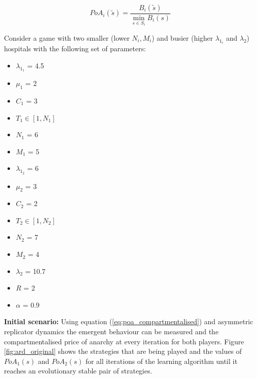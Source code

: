 \begin{equation}\label{eq:poa_compartmentalised}
    PoA_{i}(\tilde{s}) = \frac{B_i(\tilde{s})}{\min_{s \in S_i} B_i(s)}
\end{equation}

Consider a game with two smaller (lower \( N_i, M_i \)) and busier (higher 
\(\lambda_{1_i} \) and \(\lambda_2\)) hospitals with the following set of 
parameters:

\begin{multicols}{3}
    \begin{itemize}        
        \item \( \lambda_{1_1} \) = 4.5
        \item \( \mu_1 \) = 2
        \item \( C_1 \) = 3
        \item \( T_1 \in [1, N_1] \) 
        \item \( N_1 \) = 6
        \item \( M_1 \) = 5

        \columnbreak
        \item \( \lambda_{1_2} \) = 6
        \item \( \mu_2 \) = 3
        \item \( C_2 \) = 2
        \item \( T_2 \in [1, N_2] \)
        \item \( N_2 \) = 7
        \item \( M_2 \) = 4
        
        \columnbreak
        \item \( \lambda_2 \) = 10.7
        \item \( R \) = 2
        \item \( \alpha \) = 0.9
    \end{itemize}
\end{multicols}

\textbf{Initial scenario:}
Using equation (\ref{eq:poa_compartmentalised}) and asymmetric replicator 
dynamics the emergent behaviour can be measured and the compartmentalised price 
of anarchy at every iteration for both players.
Figure \ref{fig:ard_original} shows the strategies that are being played and 
the values of \(PoA_1(s)\) and \(PoA_2(s)\) for all iterations of the 
learning algorithm until it reaches an evolutionary stable pair of strategies.

